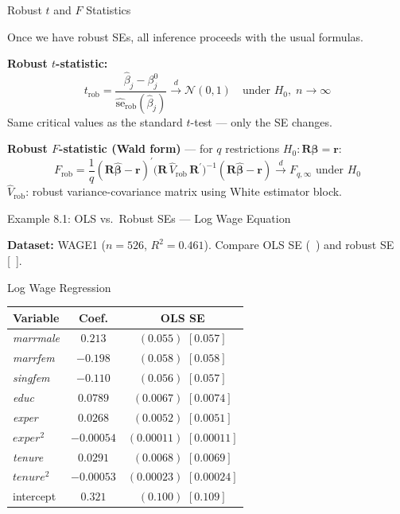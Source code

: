 \documentclass[aspectratio=169, 12pt]{beamer}
\begin{document}
\begin{frame}{Robust $t$ and $F$ Statistics}

  Once we have robust SEs, all inference proceeds with the usual formulas.

  \textbf{Robust $t$-statistic:}
  \[
    t_{\text{rob}} = \frac{\hat{\beta}_j - \beta_j^0}{\widehat{\text{se}}_{\text{rob}}(\hat{\beta}_j)}
    \overset{d}{\to} \mathcal{N}(0,1) \quad \text{under } H_0, \; n \to \infty
  \]
  Same critical values as the standard $t$-test — only the SE changes.

  \smallskip

  \begin{highlightbox}
    \textbf{Robust $F$-statistic (Wald form)} — for $q$ restrictions $H_0: \mathbf{R}\boldsymbol{\beta} = \mathbf{r}$:
    \[
      F_{\text{rob}} = \frac{1}{q}(\mathbf{R}\hat{\boldsymbol{\beta}} - \mathbf{r})^{\prime}
      \bigl(\mathbf{R}\,\widehat{V}_{\text{rob}}\,\mathbf{R}^{\prime}\bigr)^{-1}
      (\mathbf{R}\hat{\boldsymbol{\beta}} - \mathbf{r})
      \overset{d}{\to} F_{q,\infty} \text{ under } H_0
    \]
    $\widehat{V}_{\text{rob}}$: robust variance-covariance matrix using White estimator block.
  \end{highlightbox}

\end{frame}

\begin{frame}{Example 8.1: OLS vs.\ Robust SEs — Log Wage Equation}

  \textbf{Dataset:} WAGE1 ($n=526$, $R^2=0.461$). Compare OLS SE (\ ) and robust SE [\ ].

  \begin{examplebox}{Log Wage Regression}
    \begin{center}
      \footnotesize
      \begin{tabular}{lcc}
        \toprule
        Variable & Coef. & OLS SE \quad [Robust SE] \\
        \midrule
        \textit{marrmale}  & $0.213$    & $(0.055)$ \quad $[0.057]$ \\
        \textit{marrfem}   & $-0.198$   & $(0.058)$ \quad $[0.058]$ \\
        \textit{singfem}   & $-0.110$   & $(0.056)$ \quad $[0.057]$ \\
        \textit{educ}      & $0.0789$   & $(0.0067)$ \quad $[0.0074]$ \\
        \textit{exper}     & $0.0268$   & $(0.0052)$ \quad $[0.0051]$ \\
        $\textit{exper}^2$ & $-0.00054$ & $(0.00011)$ \quad $[0.00011]$ \\
        \textit{tenure}    & $0.0291$   & $(0.0068)$ \quad $[0.0069]$ \\
        $\textit{tenure}^2$& $-0.00053$ & $(0.00023)$ \quad $[0.00024]$ \\
        intercept          & $0.321$    & $(0.100)$ \quad $[0.109]$ \\
        \bottomrule
      \end{tabular}
    \end{center}
  \end{examplebox}

\end{frame}
\end{document}
